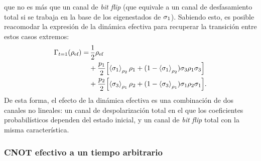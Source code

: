 que no es más que un canal de \textit{bit flip} (que equivale a un canal de desfasamiento total si se trabaja en la base de los eigenestados de $\sigma_{1}$). Sabiendo esto, es posible reacomodar la expresión de la dinámica efectiva para recuperar la transición entre estos casos extremos:
\begin{align}
  \Gamma_{t=1}(\rho_{\text{ef}})=&\,\frac{1}{2}\rho_{\text{ef}}\nonumber\\
  &+\frac{p_{1}}{2}\qty[\expval{\sigma_{1}}_{\rho_{2}}\rho_{1}+(1-\expval{\sigma_{1}}_{\rho_{2}})\sigma_{3}\rho_{1}\sigma_{3}]\nonumber\\
  &+\frac{p_{2}}{2}\qty[\expval{\sigma_{3}}_{\rho_{1}}\rho_{2}+(1-\expval{\sigma_{3}}_{\rho_{1}})\sigma_{1}\rho_{2}\sigma_{1}].\nonumber
\end{align}
De esta forma, el efecto de la dinámica efectiva es una combinación de dos canales no lineales: un canal de despolarización total en el que los coeficientes probabilísticos dependen del estado inicial, y un canal de \textit{bit flip} total con la misma característica. 

\subsubsection{CNOT efectivo a un tiempo arbitrario}

